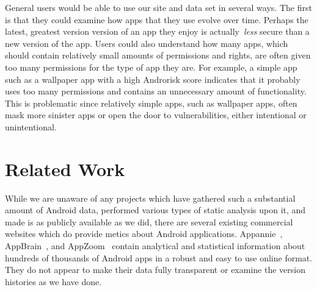 \documentclass[journal,transmag]{IEEEtran}
\newcommand{\todo}[1]{\textcolor{cyan}{\textbf{[#1]}}}
\newcommand{\dan}[1]{\textcolor{blue}{{\it [Dan says: #1]}}}
\begin{document}
General users would be able to use our site and data set in several ways. The first is that they could examine how apps that they use evolve over time. Perhaps the latest, greatest version version of an app they enjoy is actually~\emph{less} secure than a new version of the app. Users could also understand how many apps, which should contain relatively small amounts of permissions and rights, are often given too many permissions for the type of app they are. For example, a simple app such as a wallpaper app with a high Androrisk score indicates that it probably uses too many permissions and contains an unnecessary amount of functionality. This is problematic since relatively simple apps, such as wallpaper apps, often mask more sinister apps or open the door to vulnerabilities, either intentional or unintentional.

















\section{Related Work}
\label{sec: relatedwork}



While we are unaware of any projects which have gathered such a substantial amount of Android data, performed various types of static analysis upon it, and made is as publicly available as we did, there are several existing commercial websites which do provide metics about Android applications. Appannie~\cite{appAnnie_url}, AppBrain~\cite{appbrain_url}, and AppZoom~\cite{appzoom_url} contain analytical and statistical information about hundreds of thousands of Android apps in a  robust and easy to use online format. They do not appear to make their data fully transparent or examine the version histories as we have done.
\end{document}
